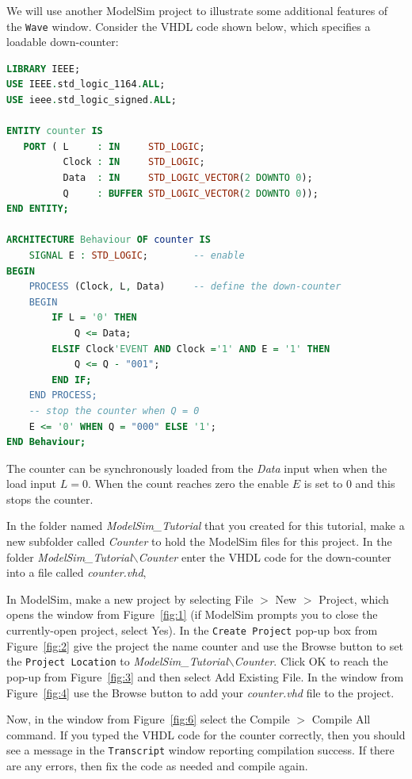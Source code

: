 \documentclass[11pt, twoside, pdftex]{article}
\begin{document}
We will use another ModelSim project to illustrate some additional features
of the \texttt{Wave} window.  Consider the VHDL code shown below, which 
specifies a loadable down-counter:
~\\
\begin{lstlisting}[language=VHDL]
LIBRARY IEEE;
USE IEEE.std_logic_1164.ALL;
USE ieee.std_logic_signed.ALL;

ENTITY counter IS
   PORT ( L     : IN     STD_LOGIC;
          Clock : IN     STD_LOGIC;
          Data  : IN     STD_LOGIC_VECTOR(2 DOWNTO 0);  
          Q     : BUFFER STD_LOGIC_VECTOR(2 DOWNTO 0));
END ENTITY; 

ARCHITECTURE Behaviour OF counter IS
    SIGNAL E : STD_LOGIC;        -- enable
BEGIN
    PROCESS (Clock, L, Data)     -- define the down-counter
    BEGIN
        IF L = '0' THEN
            Q <= Data;
        ELSIF Clock'EVENT AND Clock ='1' AND E = '1' THEN
            Q <= Q - "001";
        END IF;
    END PROCESS;
    -- stop the counter when Q = 0
    E <= '0' WHEN Q = "000" ELSE '1';
END Behaviour;
\end{lstlisting}

The counter can be synchronously loaded from the {\it Data} input when when the load input
$L = 0$. When the count reaches zero the enable $E$ is set to 0 and this stops the counter. 

In the folder named {\it ModelSim\_Tutorial} that you created for this tutorial, make a new
subfolder called {\it Counter} to hold the ModelSim files for this project.
In the folder {\it ModelSim\_Tutorial$\backslash$Counter}
enter the VHDL code for the down-counter into a file called {\it counter.vhd}, 

In ModelSim, make a new project by selecting {\sf File $>$ New $>$ Project}, which opens the window 
from Figure~\ref{fig:1} (if ModelSim prompts you to close the currently-open project, select {\sf Yes}). 
In the \texttt{Create Project} pop-up box from Figure~\ref{fig:2} give the project the name 
{\sf counter} and use the {\sf Browse} button to set the \texttt{Project Location} to
{\it ModelSim\_Tutorial$\backslash$Counter}. Click {\sf OK} to reach the pop-up from 
Figure~\ref{fig:3} and then select {\sf Add Existing File}. In the window from 
Figure~\ref{fig:4} use the {\sf Browse} button to add your {\it counter.vhd} file to the project. 

Now, in the window from Figure~\ref{fig:6} select the {\sf Compile $>$ Compile All} command.
If you typed the VHDL code for the counter correctly, then you should see a message in the
\texttt{Transcript} window reporting compilation success. If there are any errors, then fix the 
code as needed and compile again.
\end{document}
